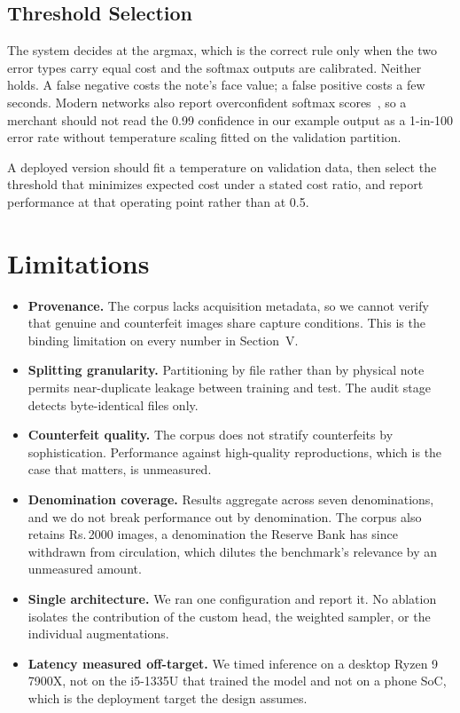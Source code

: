 \documentclass[conference]{IEEEtran}
\newcommand{\rupee}{Rs.\,}
\begin{document}
\subsection{Threshold Selection}

The system decides at the argmax, which is the correct rule only when the two
error types carry equal cost and the softmax outputs are calibrated. Neither
holds. A false negative costs the note's face value; a false positive costs a
few seconds. Modern networks also report overconfident
softmax scores~\cite{guo2017calibration}, so a merchant should not read the 0.99
confidence in our example output as a 1-in-100 error rate without temperature
scaling fitted on the validation partition.

A deployed version should fit a temperature on validation data, then select the
threshold that minimizes expected cost under a stated cost ratio, and report
performance at that operating point rather than at 0.5.

\section{Limitations}
\label{sec:limitations}

\begin{itemize}
\item \textbf{Provenance.} The corpus lacks acquisition metadata, so we cannot
verify that genuine and counterfeit images share capture conditions. This is the
binding limitation on every number in Section~V.

\item \textbf{Splitting granularity.} Partitioning by file rather than by
physical note permits near-duplicate leakage between training and test. The
audit stage detects byte-identical files only.

\item \textbf{Counterfeit quality.} The corpus does not stratify counterfeits by
sophistication. Performance against high-quality reproductions, which is the case
that matters, is unmeasured.

\item \textbf{Denomination coverage.} Results aggregate across seven
denominations, and we do not break performance out by denomination. The corpus
also retains \rupee2000 images, a denomination the Reserve Bank has since
withdrawn from circulation, which dilutes the benchmark's relevance by an
unmeasured amount.

\item \textbf{Single architecture.} We ran one configuration and report it. No
ablation isolates the contribution of the custom head, the weighted sampler, or
the individual augmentations.

\item \textbf{Latency measured off-target.} We timed inference on a desktop
Ryzen 9 7900X, not on the i5-1335U that trained the model and not on a phone
SoC, which is the deployment target the design assumes.
\end{itemize}
\end{document}

